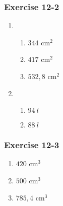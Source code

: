 \subsubsection*{Exercise 12-2} %
\begin{enumerate}[noitemsep, label=\textbf{\arabic*}. ] 
\item %
 \begin{enumerate}[noitemsep, label=\textbf{(\alph*)} ]
  \item $344$ cm$^2$
\item  $417$ cm$^2$
\item  $532,8$ cm$^2$
 \end{enumerate}


\item %
 \begin{enumerate}[noitemsep, label=\textbf{(\alph*)} ]
\item $94~ l$ %
\item $88 ~l$%
\end{enumerate}


 \end{enumerate}       
\subsubsection*{Exercise 12-3} %
\begin{enumerate}[noitemsep, label=\textbf{\arabic*}. ] 
\item $420$ cm$^3$
\item $500$ cm$^3$
\item $785,4$ cm$^3$
\end{enumerate}

